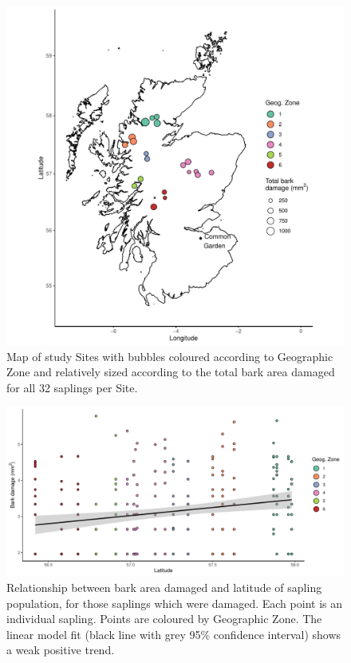 \documentclass[a4paper, 11pt]{article}
\begin{document}
\begin{figure}[H]
	\includegraphics[width=\textwidth]{bubble_map}	
	\caption{Map of study Sites with bubbles coloured according to Geographic Zone and relatively sized according to the total bark area damaged for all 32 saplings per Site.}
	\label{bubble_map}
\end{figure}

\begin{figure}[H]
	\includegraphics[width=\textwidth]{latitude}
	\caption{Relationship between bark area damaged and latitude of sapling population, for those saplings which were damaged. Each point is an individual sapling. Points are coloured by Geographic Zone. The linear model fit (black line with grey 95\% confidence interval) shows a weak positive trend.}
	\label{latitude}
\end{figure}
\end{document}
